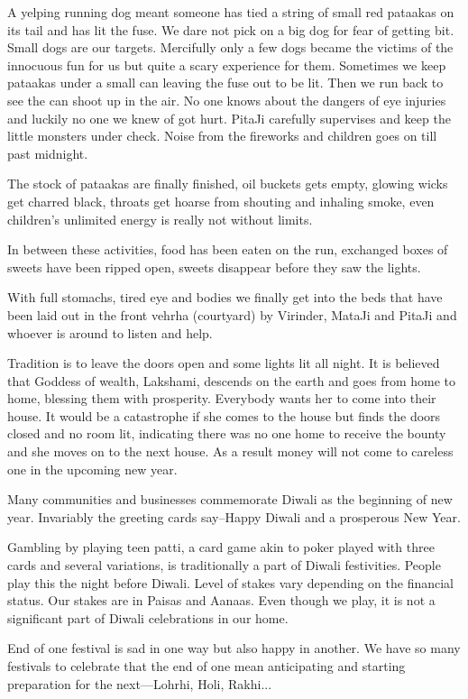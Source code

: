 A yelping running dog meant someone has tied a string of small red
pataakas on its tail and has lit the fuse. We dare not pick on a big dog
for fear of getting bit. Small dogs are our targets. Mercifully only a few
dogs became the victims of the innocuous fun for us but quite a scary
experience for them. Sometimes we keep pataakas under a small can leaving
the fuse out to be lit. Then we run back to see the can shoot up in the
air. No one knows about the dangers of eye injuries and luckily no one we
knew of got hurt. PitaJi carefully supervises and keep the little monsters
under check. Noise from the fireworks and children goes on till past
midnight. 

The stock of pataakas are finally finished, oil buckets gets empty,
glowing wicks get charred black, throats get hoarse from shouting and
inhaling smoke, even children's unlimited energy is really not without
limits. 

In between these activities, food has been eaten on the run, exchanged
boxes of sweets have been ripped open, sweets disappear before they saw
the lights. 

With full stomachs, tired eye and bodies we finally get into the beds that
have been laid out in the front vehrha (courtyard) by Virinder, MataJi and
PitaJi and whoever is around to listen and help. 

Tradition is to leave the doors open and some lights lit all night. It is
believed that Goddess of wealth, Lakshami, descends on the earth and goes
from home to home, blessing them with prosperity. Everybody wants her to
come into their house. It would be a catastrophe if she comes to the house
but finds the doors closed and no room lit, indicating there was no one
home to receive the bounty and she moves on to the next house. As a result
money will not come to careless one in the upcoming new year. 

Many communities and businesses commemorate Diwali as the beginning of new
year. Invariably the greeting cards say--Happy Diwali and a prosperous New
Year. 

Gambling by playing teen patti, a card game akin to poker played with
three cards and several variations, is traditionally a part of Diwali
festivities. People play this the night before Diwali. Level of stakes
vary depending on the financial status. Our stakes are in Paisas and
Aanaas. Even though we play, it is not a significant part of Diwali
celebrations in our home. 

End of one festival is sad in one way but also happy in another. We have
so many festivals to celebrate that the end of one mean anticipating and
starting preparation for the next—Lohrhi, Holi, Rakhi...
